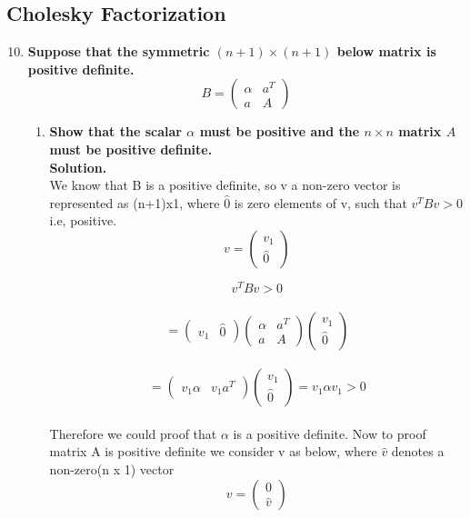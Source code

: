 \documentclass[12pt, oneside]{article}   	%
\begin{document}
\subsection*{Cholesky Factorization}
\begin{enumerate}
\setcounter{enumi}{9}
\item \textbf{ Suppose that the symmetric $(n+1) \times (n+1)$ below matrix is positive definite.
$$
B = \begin{pmatrix}
\alpha & a^T \\
a & A
\end{pmatrix}
$$
}
\begin{enumerate}
	\item \textbf{Show that the scalar $\alpha$ must be positive and the $n \times n$ matrix $A$ must be positive definite.}\\
	
	\textbf{Solution.}\\
	
	We know that B is a positive definite, so v a non-zero vector is represented as (n+1)x1, where $\hat{0}$ is zero elements of v, such that $v^{T}Bv >0$ i.e, positive.
	$$
	v= (\begin{array}{c} v_1\\ \hat{0}
	\end{array})
	$$
	
	$$v^{T}Bv >0$$\\
	$$
	=(\begin{array}{cc} v_1& \hat{0}
	\end{array}) (\begin{array}{cc} \alpha & a^T \\
	a & A
	\end{array})(\begin{array}{c} v_1\\ \hat{0}
	\end{array})
	$$\\
	$$
	=(\begin{array}{cc} v_1\alpha & v_1a^T 
	\end{array})(\begin{array}{c} v_1\\ \hat{0}
	\end{array})= v_1\alpha v_1 >0
	$$\\
	Therefore we could proof that $\alpha$ is a positive definite. Now to proof matrix A is positive definite we consider  v as below, where $\hat{v}$ denotes a non-zero(n x 1) vector
	$$
	v= (\begin{array}{c} 0\\ \hat{v}
	\end{array})
	$$
	

\end{enumerate}
\end{enumerate}
\end{document}
